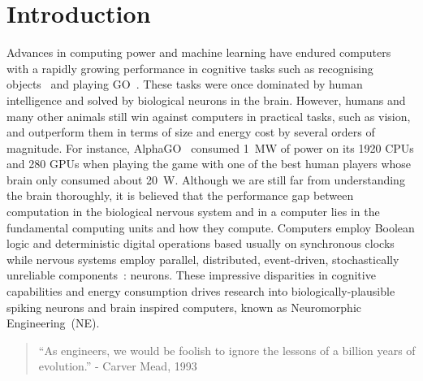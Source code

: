 \chapter{Introduction}
\label{cha:intro}
Advances in computing power and machine learning have endured computers with a rapidly growing performance in cognitive tasks such as recognising objects~\citep{deng2009imagenet} and playing GO~\citep{silver2016mastering}. 
These tasks were once dominated by human intelligence and solved by biological neurons in the brain.
However, humans and many other animals still win against computers in practical tasks, such as vision, and outperform them in terms of size and energy cost by several orders of magnitude.
For instance, AlphaGO~\citep{silver2016mastering} consumed 1~MW of power on its 1920 CPUs and 280 GPUs when playing the game with one of the best human players whose brain only consumed about 20~W.
Although we are still far from understanding the brain thoroughly, it is believed that the performance gap between computation in the biological nervous system and in a computer lies in the fundamental computing units and how they compute.
Computers employ Boolean logic and deterministic digital operations based usually on synchronous clocks while nervous systems employ parallel, distributed, event-driven, stochastically unreliable components~\citep{indiveri2009artificial}: neurons.
These impressive disparities in cognitive capabilities and energy consumption drives research into biologically-plausible spiking neurons and brain inspired computers, known as Neuromorphic Engineering~(NE).

\begin{quotation}
	``As engineers, we would be foolish to ignore the lessons of a billion years of evolution.'' - Carver Mead, 1993
\end{quotation}



